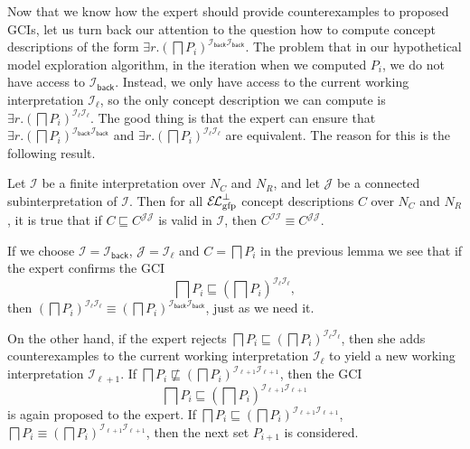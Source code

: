 Now that we know how the expert should provide counterexamples to proposed GCIs, let us
turn back our attention to the question how to compute concept descriptions of the form
$\exists r. (\bigsqcap P_{i})^{\mathcal{I}_{\mathsf{back}}\mathcal{I}_{\mathsf{back}}}$.
The problem that in our hypothetical model exploration algorithm, in the iteration when we
computed $P_{i}$, we do not have access to $\mathcal{I}_{\mathsf{back}}$.  Instead, we
only have access to the current working interpretation $\mathcal{I}_{\ell}$, so the only
concept description we can compute is $\exists r. (\bigsqcap
P_{i})^{\mathcal{I}_{\ell}\mathcal{I}_{\ell}}$.  The good thing is that the expert can
ensure that $\exists r. (\bigsqcap
P_{i})^{\mathcal{I}_{\mathsf{back}}\mathcal{I}_{\mathsf{back}}}$ and $\exists
r. (\bigsqcap P_{i})^{\mathcal{I}_{\ell}\mathcal{I}_{\ell}}$ are equivalent.  The reason
for this is the following result.

\begin{Lemma}
  \label{lem:Felix-6.14}
  Let $\mathcal{I}$ be a finite interpretation over $N_{C}$ and $N_{R}$, and let
  $\mathcal{J}$ be a connected subinterpretation of $\mathcal{I}$.  Then for all
  ${{\mathcal{E}\kern-.3ex\mathcal{L}}_\text{gfp}^\bot}$ concept descriptions $C$ over $N_{C}$ and $N_{R}$, it is true that if $C
  \sqsubseteq C^{\mathcal{J}\mathcal{J}}$ is valid in $\mathcal{I}$, then
  $C^{\mathcal{I}\mathcal{I}} \equiv C^{\mathcal{J}\mathcal{J}}$.
\end{Lemma}

If we choose $\mathcal{I} = \mathcal{I}_{\mathsf{back}}$, $\mathcal{J} =
\mathcal{I}_{\ell}$ and $C = \bigsqcap P_{i}$ in the previous lemma we see that if the
expert confirms the GCI
\begin{equation*}
  \bigsqcap P_{i} \sqsubseteq (\bigsqcap P_{i})^{\mathcal{I}_{\ell}\mathcal{I}_{\ell}},
\end{equation*}
then $(\bigsqcap P_{i})^{\mathcal{I}_{\ell}\mathcal{I}_{\ell}} \equiv (\bigsqcap
P_{i})^{\mathcal{I}_{\mathsf{back}}\mathcal{I}_{\mathsf{back}}}$, just as we need it.

On the other hand, if the expert rejects $\bigsqcap P_{i} \sqsubseteq (\bigsqcap
P_{i})^{\mathcal{I}_{\ell}\mathcal{I}_{\ell}}$, then she adds counterexamples to the
current working interpretation $\mathcal{I}_{\ell}$ to yield a new working interpretation
$\mathcal{I}_{\ell+1}$.  If $\bigsqcap P_{i} \not\sqsubseteq (\bigsqcap
P_{i})^{\mathcal{I}_{\ell+1}\mathcal{I}_{\ell+1}}$, then the GCI
\begin{equation*}
  \bigsqcap P_{i} \sqsubseteq (\bigsqcap P_{i})^{\mathcal{I}_{\ell+1}\mathcal{I}_{\ell+1}}
\end{equation*}
is again proposed to the expert.  If $\bigsqcap P_{i} \sqsubseteq (\bigsqcap
P_{i})^{\mathcal{I}_{\ell+1}\mathcal{I}_{\ell+1}}$, \ie $\bigsqcap P_{i} \equiv (\bigsqcap
P_{i})^{\mathcal{I}_{\ell+1}\mathcal{I}_{\ell+1}}$, then the next set $P_{i+1}$ is
considered.

